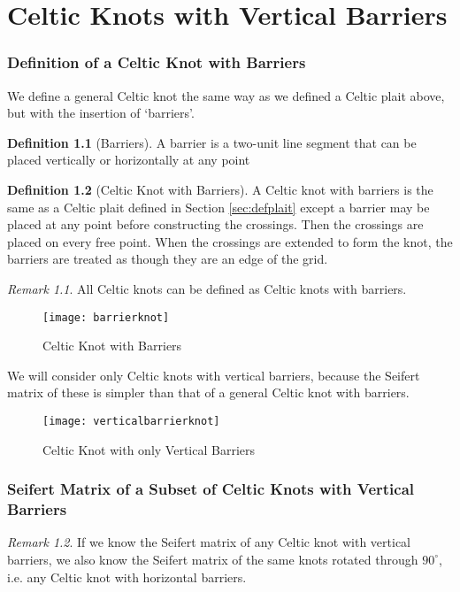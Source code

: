 \documentclass[10pt,a4paper]{report}
\theoremstyle{definition}
\newtheorem{definition}{Definition}[section]
\theoremstyle{remark}
\newtheorem*{remark}{Remark}
\theoremstyle{example}
\begin{document}
\chapter{Celtic Knots with Vertical Barriers}
\subsection{Definition of a Celtic Knot with Barriers}
 We define a general Celtic knot the same way as we defined a Celtic plait above, but with the insertion of `barriers'.
 \begin{definition}[Barriers]
  A barrier is a two-unit line segment that can be placed vertically or horizontally at any point %
 \end{definition}
 
\begin{definition}[Celtic Knot with Barriers]
  A Celtic knot with barriers is the same as a Celtic plait defined in Section \ref{sec:defplait} except a barrier may be placed at any point before constructing the crossings. Then the crossings are placed on every free point. When the crossings are extended to form the knot, the barriers are treated as though they are an edge of the grid.
\end{definition}

\begin{remark}
 All Celtic knots can be defined as Celtic knots with barriers.
\end{remark}

\begin{figure}[H]
\centering
\graphicspath{{/Users/Imogen/Desktop/seifertimages/lapath/}}
\texttt{[image: barrierknot]}
\caption{Celtic Knot with Barriers}
\label{barrierknot}
\end{figure}
 
 We will consider only Celtic knots with vertical barriers, because the Seifert matrix of these is simpler than that of a general Celtic knot with barriers.

\begin{figure}[H]
\centering
\graphicspath{{/Users/Imogen/Desktop/seifertimages/lapath/}}
\texttt{[image: verticalbarrierknot]}
\caption{Celtic Knot with only Vertical Barriers}
\label{verticalbarrierknot}
\end{figure}


\subsection{Seifert Matrix of a Subset of Celtic Knots with Vertical Barriers}
\begin{remark}
 If we know the Seifert matrix of any Celtic knot with vertical barriers, we also know the Seifert matrix of the same knots rotated through $90^{\circ}$, i.e. any Celtic knot with horizontal barriers.
\end{remark}
\end{document}
